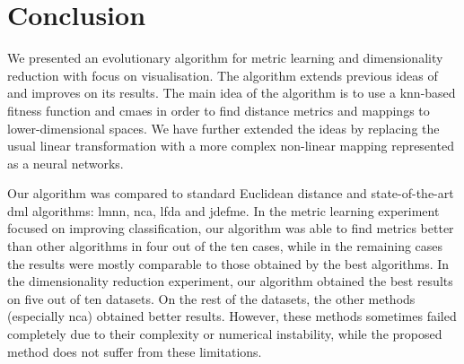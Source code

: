 \documentclass[12pt,a4paper]{report}
\begin{document}








\chapter{Conclusion} \label{chap:conclusion}

We presented an evolutionary algorithm for metric learning and dimensionality reduction with focus on visualisation. The algorithm extends previous ideas of~\citep{fukui2013evolutionary} and improves on its results. The main idea of the algorithm is to use a \ac{knn}-based fitness function and \ac{cmaes} in order to find distance metrics and mappings to lower-dimensional spaces. We have further extended the ideas by replacing the usual linear transformation with a more complex non-linear mapping represented as a neural networks.

Our algorithm was compared to standard Euclidean distance and state-of-the-art \ac{dml} algorithms: \ac{lmnn}, \ac{nca}, \ac{lfda} and \ac{jdefme}. In the metric learning experiment focused on improving classification, our algorithm was able to find metrics better than other algorithms in four out of the ten cases, while in the remaining cases the results were mostly comparable to those obtained by the best algorithms. In the dimensionality reduction experiment, our algorithm obtained the best results on five out of ten datasets. On the rest of the datasets, the other methods (especially \ac{nca}) obtained better results. However, these methods sometimes failed completely due to their complexity or numerical instability, while the proposed method does not suffer from these limitations.
\end{document}
